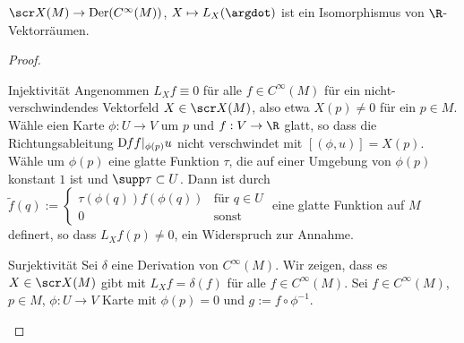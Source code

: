 \begin{st} \label{3.16}
    $\scr X(M) \to \Der(C^\infty(M))$, $X \mapsto L_X(\argdot)$ ist ein Isomorphismus von $\R$-Vektorräumen.
    \begin{proof}
        \begin{seg}{Injektivität}
            Angenommen $L_X f \equiv 0$ für alle $f \in C^\infty(M)$ für ein nicht-verschwindendes Vektorfeld $X \in \scr X(M)$, also etwa $X(p) \neq 0$ für ein $p \in M$.
            Wähle eien Karte $\phi: U \to V$ um $p$ und $f: V \to \R$ glatt, so dass die Richtungsableitung $\Df f|_{\phi(p)} u$ nicht verschwindet mit $[(\phi, u)] = X(p)$.
            Wähle um $\phi(p)$ eine glatte Funktion $\tau$, die auf einer Umgebung von $\phi(p)$ konstant $1$ ist und $\supp \tau \subset U$.
            Dann ist durch
            \begin{math}
                \tilde f(q) := \begin{cases}
                    \tau(\phi(q)) f(\phi(q)) & \text{für $q \in U$} \\
                    0 & \text{sonst}
                \end{cases}
            \end{math}
            eine glatte Funktion auf $M$ definert, so dass $L_X f(p) \neq 0$, ein Widerspruch zur Annahme.
        \end{seg}
        \begin{seg}{Surjektivität}
            Sei $\delta$ eine Derivation von $C^\infty(M)$.
            Wir zeigen, dass es $X \in \scr X(M)$ gibt mit $L_X f = \delta(f)$ für alle $f \in C^\infty(M)$.
            Sei $f \in C^\infty(M)$, $p \in M$, $\phi: U \to V$ Karte mit $\phi(p) = 0$ und $g := f \circ \phi^{-1}$.


\end{seg}
\end{proof}
\end{st}
